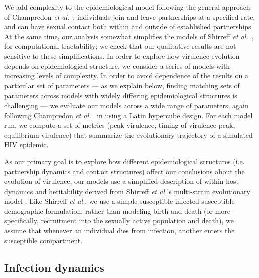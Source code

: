 \documentclass[10pt,letterpaper]{article}
\newcommand{\etal}{\textit{et al.}}
\begin{document}
We add complexity to the epidemiological model following the general approach of Champredon \etal\ \cite{champredon_hiv_2013}; individuals join and leave partnerships at a specified rate, and can have sexual contact both within and outside of established partnerships. At the same time, our analysis somewhat simplifies the models of Shirreff \etal\ \cite{shirreff_transmission_2011}, for computational tractability; we check that our qualitative results are not sensitive to these simplifications. In order to explore how virulence evolution depends on epidemiological structure, we consider a series of models with increasing levels of complexity. In order to avoid dependence of the results on a particular set of parameters --- as we explain below, finding matching sets of parameters across models with widely differing epidemiological structures is challenging --- we evaluate our models across a wide range of parameters, again following Champredon \etal\ \cite{champredon_hiv_2013} in using a Latin hypercube design. For each model run, we compute a set of metrics (peak virulence, timing of virulence peak, equilibrium virulence) that summarize the evolutionary trajectory of a simulated HIV epidemic.

As our primary goal is to explore how different epidemiological structures (i.e. partnership dynamics and contact structures) affect our conclusions about the evolution of virulence, our models use a simplified description of within-host dynamics and heritability derived from 
Shirreff \etal's multi-strain evolutionary model \cite{shirreff_transmission_2011}. Like Shirreff \etal, we use a simple susceptible-infected-susceptible demographic formulation; rather than modeling birth and death (or more specifically, recruitment into the sexually active population and death), we assume that whenever an individual dies from infection, another enters the susceptible compartment.

\subsection*{Infection dynamics}
\end{document}
